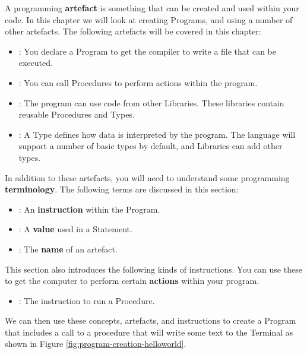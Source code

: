 A programming \textbf{artefact} is something that can be created and used within your code. In this chapter we will look at creating Programs, and using a number of other artefacts. The following artefacts will be covered in this chapter:
\begin{itemize}
  \item {}: You declare a Program to get the compiler to write a file that can be executed.
  \item {}: You can call Procedures to perform actions within the program.
  \item {}: The program can use code from other Libraries. These libraries contain reusable Procedures and Types. 
  \item {}: A Type defines how data is interpreted by the program. The language will support a number of basic types by default, and Libraries can add other types. 
\end{itemize}

In addition to these artefacts, you will need to understand some programming \textbf{terminology}. The following terms are discussed in this section:
\begin{itemize}
  \item {}: An \textbf{instruction} within the Program.
  \item {}: A \textbf{value} used in a Statement.
  \item {}: The \textbf{name} of an artefact.
\end{itemize}

This section also introduces the following kinds of instructions. You can use these to get the computer to perform certain \textbf{actions} within your program.
\begin{itemize}
  \item {}: The instruction to run a Procedure.
\end{itemize}

We can then use these concepts, artefacts, and instructions to create a Program that includes a call to a procedure that will write some text to the Terminal as shown in Figure \ref{fig:program-creation-helloworld}.

